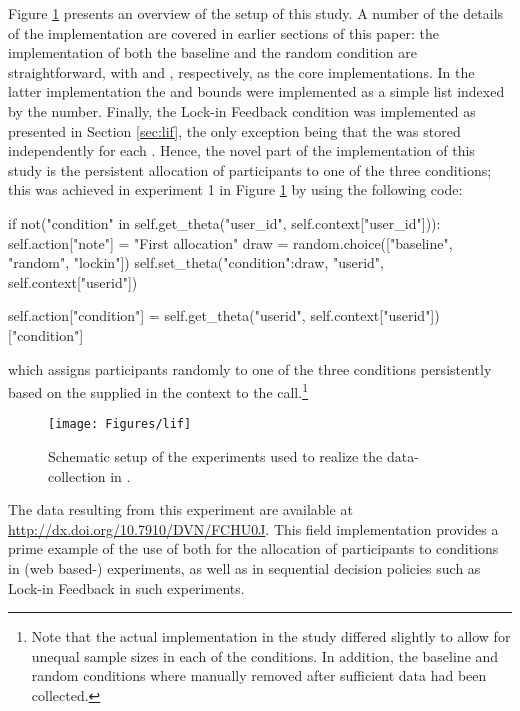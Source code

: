 \documentclass[nojss]{jss}
\begin{document}
Figure \ref{fig:lif} presents an overview of the setup of this study. A number of the details of the implementation are covered in earlier sections of this paper: the implementation of both the baseline and the random condition are straightforward, with  and , respectively, as the core  implementations. In the latter implementation the  and  bounds were implemented as a simple list indexed by the  number. Finally, the Lock-in Feedback condition was implemented as presented in Section \ref{sec:lif}, the only exception being that the  was stored independently for each . Hence, the novel part of the implementation of this study is the persistent allocation of participants to one of the three conditions; this was achieved in experiment 1 in Figure \ref{fig:lif} by using the following
 code:

 \begin{Code}
if not("condition" in self.get_theta("user_id", self.context["user_id"])):
    self.action["note"] = "First allocation"
    draw = random.choice(["baseline", "random", "lockin"])
    self.set_theta({"condition":draw}, "userid", self.context["userid"])

self.action["condition"] = 
    self.get_theta("userid", self.context["userid"])["condition"]
\end{Code}
which assigns participants randomly to one of the three conditions persistently based on the  supplied in the context to the  call.\footnote{Note that the actual implementation in the study differed slightly to allow for unequal sample sizes in each of the conditions. In addition, the baseline and random conditions where manually removed after sufficient data had been collected.}

\begin{figure}[h!]
  \centering
    \texttt{[image: Figures/lif]}
      \caption{Schematic setup of the   experiments used to realize the data-collection in \citep{kaptein2016tracking}.}
      \label{fig:lif}
\end{figure}

The data resulting from this experiment are available at \url{http://dx.doi.org/10.7910/DVN/FCHU0J}. This field implementation provides a prime example of the use of  both for the allocation of participants to conditions in (web based-) experiments, as well as in sequential decision policies such as Lock-in Feedback in such experiments.
\end{document}

